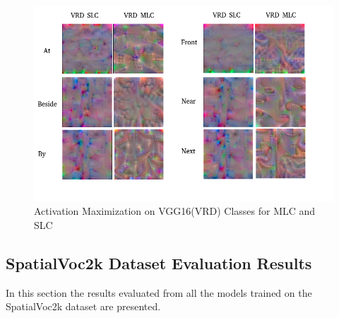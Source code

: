 \documentclass{csfyp}
\begin{document}
\begin{figure}[!htbp]
	\includegraphics[scale=0.60,center]{NewVRD2.pdf}
	\caption{Activation Maximization on VGG16(VRD) Classes for MLC and SLC}
	\vspace{-4mm}
\end{figure}
\newpage
\subsection{SpatialVoc2k Dataset Evaluation Results}
In this section the results evaluated from all the models trained on the SpatialVoc2k dataset are presented.
\end{document}
